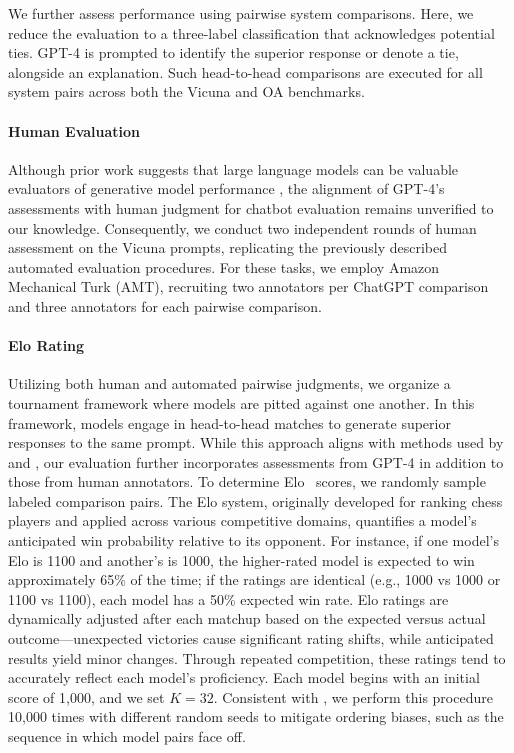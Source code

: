 We further assess performance using pairwise system comparisons. Here, we reduce the evaluation to a three-label classification that acknowledges potential ties. GPT-4 is prompted to identify the superior response or denote a tie, alongside an explanation. Such head-to-head comparisons are executed for all system pairs across both the Vicuna and OA benchmarks.

\paragraph{Human Evaluation} Although prior work suggests that large language models can be valuable evaluators of generative model performance \citep{fu2023gptscore}, the alignment of GPT-4’s assessments with human judgment for chatbot evaluation remains unverified to our knowledge. Consequently, we conduct two independent rounds of human assessment on the Vicuna prompts, replicating the previously described automated evaluation procedures. For these tasks, we employ Amazon Mechanical Turk (AMT), recruiting two annotators per ChatGPT comparison and three annotators for each pairwise comparison.

\paragraph{Elo Rating} Utilizing both human and automated pairwise judgments, we organize a tournament framework where models are pitted against one another. In this framework, models engage in head-to-head matches to generate superior responses to the same prompt. While this approach aligns with methods used by \citet{bai2022training} and \citet{vicuna2023}, our evaluation further incorporates assessments from GPT-4 in addition to those from human annotators. To determine Elo~\citep{elo1967proposed,elo1978rating} scores, we randomly sample labeled comparison pairs. The Elo system, originally developed for ranking chess players and applied across various competitive domains, quantifies a model’s anticipated win probability relative to its opponent. For instance, if one model’s Elo is 1100 and another’s is 1000, the higher-rated model is expected to win approximately 65\% of the time; if the ratings are identical (e.g., 1000 vs 1000 or 1100 vs 1100), each model has a 50\% expected win rate. Elo ratings are dynamically adjusted after each matchup based on the expected versus actual outcome—unexpected victories cause significant rating shifts, while anticipated results yield minor changes. Through repeated competition, these ratings tend to accurately reflect each model’s proficiency. Each model begins with an initial score of 1,000, and we set $K=32$. Consistent with \citet{vicuna2023}, we perform this procedure 10,000 times with different random seeds to mitigate ordering biases, such as the sequence in which model pairs face off.

